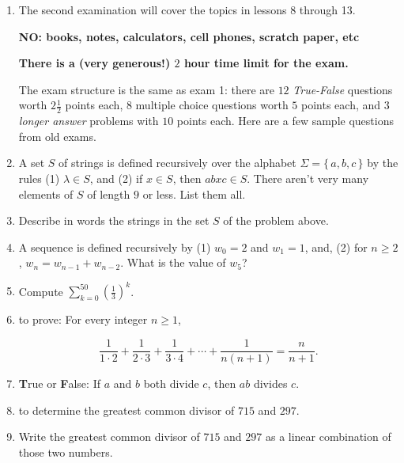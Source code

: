 \documentclass[11pt]{amsart}
\begin{document}
\begin{enumerate}

\item[]

\centerline{The second examination will cover the topics in lessons 8 through 13.}

\medskip
\centerline{\bf NO: books, notes, calculators, cell phones, scratch paper, etc}

\medskip
\centerline{\bf There is a (very generous!) $2$ hour time limit for the exam.}

\medskip
\begin{center} The exam structure is the same as exam 1: there are $12$ {\it True-False} questions worth $2\frac{1}{2}$ points each, 
$8$ multiple choice questions worth $5$ points each, and $3$ {\it longer answer} 
problems with $10$ points each. Here are a few sample questions from old exams.
\end{center}

\medskip

\item  A set $S$ of strings is defined recursively over the alphabet $\Sigma = \{\,a,b,c\,\}$
by the rules (1) $\lambda\in S$, and (2) if $x\in S$, then $abxc\in S$. There aren't very
many elements of $S$ of length $9$ or less. List them all.

\medskip

\item Describe in words the strings in the set $S$ of the problem above.

\medskip

\item A sequence is defined recursively by (1) $w_0 = 2$ and $w_1 = 1$, and,
(2) for $n\geq 2$,  $w_n = w_{n-1} + w_{n-2}$. What is the value of $w_5$?

\medskip

\item Compute $\displaystyle \sum_{k=0}^{50} \left(\frac{1}{3}\right)^k$.

\medskip

\item {} to prove: For every integer $n\geq 1$,

\[
\frac{1}{1\cdot2}+\frac{1}{2\cdot3}+\frac{1}{3\cdot4}+\cdots+\frac{1}{n(n+1)}= \frac{n}{n+1}.
\]


\item {\bf T}rue or {\bf F}alse:  If $a$ and $b$ both divide $c$, then $ab$ divides $c$.

\medskip
\item {} to determine 
the greatest 
common divisor of $715$ and $297$. 

\medskip

\item Write the greatest common divisor of $715$ and $297$ as a linear combination 
of those two numbers.

\end{enumerate}
\end{document}
